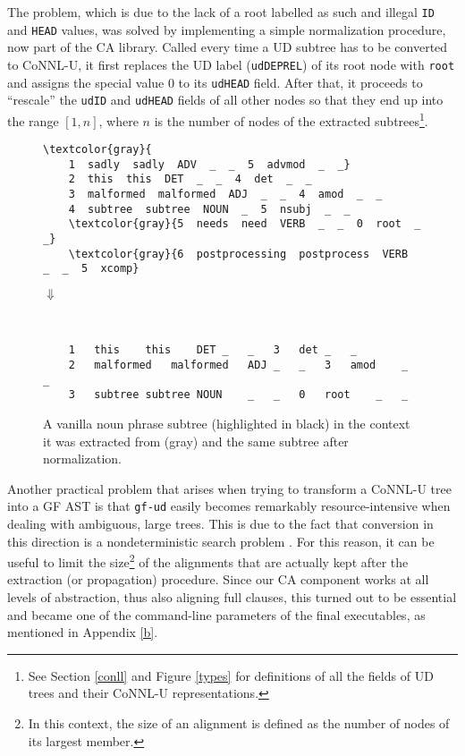 The problem, which is due to the lack of a root labelled as such and illegal \texttt{ID} and \texttt{HEAD} values, was solved by implementing a simple normalization procedure, now part of the CA library. 
Called every time a UD subtree has to be converted to CoNNL-U, it first replaces the UD label (\texttt{udDEPREL}) of its root node with \texttt{root} and assigns the special value 0 to its \texttt{udHEAD} field. 
After that, it proceeds to ``rescale'' the \texttt{udID} and \texttt{udHEAD} fields of all other nodes so that they end up into the range $[1,n]$, where $n$ is the number of nodes of the extracted subtrees\footnote{See Section \ref{conll} and Figure \ref{types} for definitions of all the fields of UD trees and their CoNNL-U representations.}. \smallskip

\begin{figure}[H]
\small
\begin{Verbatim}[commandchars=\\\{\}]
\textcolor{gray}{   
    1  sadly  sadly  ADV  _  _  5  advmod  _  _}
    2  this  this  DET  _  _  4  det  _  _
    3  malformed  malformed  ADJ  _  _  4  amod  _  _
    4  subtree  subtree  NOUN  _  5  nsubj  _  _
    \textcolor{gray}{5  needs  need  VERB  _  _  0  root  _  _}
    \textcolor{gray}{6  postprocessing  postprocess  VERB  _  _  5  xcomp}

\end{Verbatim}
\centering
\large
$\Downarrow$
\small
\begin{verbatim}


    1	this	this	DET	_	_	3	det	_	_
    2	malformed	malformed	ADJ	_	_	3	amod	_	_
    3	subtree	subtree	NOUN	_	_	0	root	_	_
\end{verbatim}
\caption[A UD subtree and its normalization]{A vanilla noun phrase subtree (highlighted in black) in the context it was extracted from (gray) and the same subtree after normalization.}
\label{normalization}
\end{figure}

Another practical problem that arises when trying to transform a CoNNL-U tree into a GF AST is that \texttt{gf-ud} easily becomes remarkably resource-intensive when dealing with ambiguous, large trees. 
This is due to the fact that conversion in this direction is a nondeterministic search problem \cite{udgf}. 
For this reason, it can be useful to limit the size\footnote{In this context, the size of an alignment is defined as the number of nodes of its largest member.} of the alignments that are actually kept after the extraction (or propagation) procedure. 
Since our CA component works at all levels of abstraction, thus also aligning full clauses, this turned out to be essential and became one of the command-line parameters of the final executables, as mentioned in Appendix \ref{b}. \smallskip

